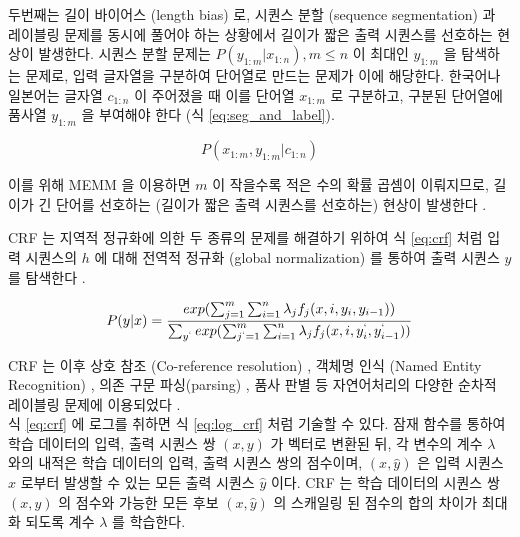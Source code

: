 \documentclass[11pt]{article}
\begin{document}
두번째는 길이 바이어스 (length bias) 로, 시퀀스 분할 (sequence segmentation) 과 레이블링 문제를 동시에 풀어야 하는 상황에서 길이가 짧은 출력 시퀀스를 선호하는 현상이 발생한다.
시퀀스 분할 문제는 $P(y_{1:m} \vert x_{1:n}), m \le n$ 이 최대인 $y_{1:m}$ 을 탐색하는 문제로, 입력 글자열을 구분하여 단어열로 만드는 문제가 이에 해당한다.
한국어나 일본어는 글자열 $c_{1:n}$ 이 주어졌을 때 이를 단어열 $x_{1:m}$ 로 구분하고, 구분된 단어열에 품사열 $y_{1:m}$ 을 부여해야 한다 (식 \ref{eq:seg_and_label}).

\begin{equation}
  \label{eq:seg_and_label}
  P(x_{1:m}, y_{1:m} \vert c_{1:n})
\end{equation}

이를 위해 MEMM 을 이용하면 $m$ 이 작을수록 적은 수의 확률 곱셈이 이뤄지므로, 길이가 긴 단어를 선호하는 (길이가 짧은 출력 시퀀스를 선호하는) 현상이 발생한다 \citep{kudo2004applying}.

CRF 는 지역적 정규화에 의한 두 종류의 문제를 해결하기 위하여 식 \ref{eq:crf} 처럼 입력 시퀀스의 $h$ 에 대해 전역적 정규화 (global normalization) 를 통하여 출력 시퀀스 $y$ 를 탐색한다 \citep{lafferty2001conditional}.

\begin{equation}
  \label{eq:crf}
  P(y \vert x) = \frac{exp(\sum_{j=1}^{m} \sum_{i=1}^{n} \lambda_j f_j (x, i, y_i, y_{i-1}))}{ \sum_{y^{`}} exp(\sum_{j^{`}=1}^{m} \sum_{i=1}^{n} \lambda_j f_j (x, i, y_i^{`}, y_{i-1}^{`})) }
\end{equation}

CRF 는 이후 상호 참조 (Co-reference resolution) \citep{mccallum2005conditional}, 객체명 인식 (Named Entity Recognition)  \citep{ritter2011named, minkov2005extracting, ling2012fine, sang2003introduction, sarawagi2005semi}, 의존 구문 파싱(parsing) \citep{sha2003shallow, finkel2008efficient}, 품사 판별 \citep{toutanova2003feature, gimpel2010part} 등 자연어처리의 다양한 순차적 레이블링 문제에 이용되었다 \citep{choi2005identifying, mccallum2003early}. \\

식 \ref{eq:crf} 에 로그를 취하면 식 \ref{eq:log_crf} 처럼 기술할 수 있다.
잠재 함수를 통하여 학습 데이터의 입력, 출력 시퀀스 쌍 $(x, y)$ 가 벡터로 변환된 뒤, 각 변수의 계수 $\lambda$ 와의 내적은 학습 데이터의 입력, 출력 시퀀스 쌍의 점수이며, $(x, \hat{y})$ 은 입력 시퀀스 $x$ 로부터 발생할 수 있는 모든 출력 시퀀스 $\hat{y}$ 이다.
CRF 는 학습 데이터의 시퀀스 쌍 $(x, y)$ 의 점수와 가능한 모든 후보 $(x, \hat{y})$ 의 스캐일링 된 점수의 합의 차이가 최대화 되도록 계수 $\lambda$ 를 학습한다.
\end{document}
